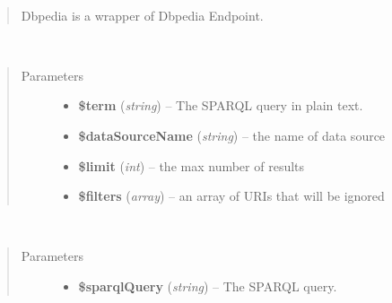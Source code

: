 \documentclass[letterpaper,10pt,english]{sphinxmanual}
\begin{document}
\begin{fulllineitems}
\label{docs/api:Dbpedia}~\begin{quote}

Dbpedia is a wrapper of Dbpedia Endpoint.
\end{quote}

\begin{fulllineitems}
\label{docs/api:Dbpedia::composeQuery}~\begin{quote}\begin{description}
\item[{Parameters}] \leavevmode\begin{itemize}
\item {} 
\textbf{\$term} (\emph{string}) -- The SPARQL query in plain text.

\item {} 
\textbf{\$dataSourceName} (\emph{string}) -- the name of data source

\item {} 
\textbf{\$limit} (\emph{int}) -- the max number of results

\item {} 
\textbf{\$filters} (\emph{array}) -- an array of URIs that will be ignored

\end{itemize}

\end{description}\end{quote}

\end{fulllineitems}


\begin{fulllineitems}
\label{docs/api:Dbpedia::query}~\begin{quote}\begin{description}
\item[{Parameters}] \leavevmode\begin{itemize}
\item {} 
\textbf{\$sparqlQuery} (\emph{string}) -- The SPARQL query.

\end{itemize}

\end{description}\end{quote}

\end{fulllineitems}


\end{fulllineitems}
\end{document}
